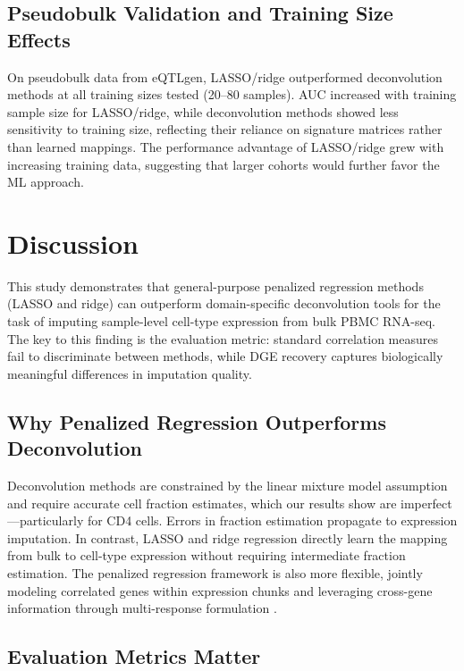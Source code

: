 \documentclass[12pt]{article}
\begin{document}
\subsection{Pseudobulk Validation and Training Size Effects}

On pseudobulk data from eQTLgen, LASSO/ridge outperformed deconvolution methods at all training sizes tested (20--80 samples). AUC increased with training sample size for LASSO/ridge, while deconvolution methods showed less sensitivity to training size, reflecting their reliance on signature matrices rather than learned mappings. The performance advantage of LASSO/ridge grew with increasing training data, suggesting that larger cohorts would further favor the ML approach.

\section{Discussion}

This study demonstrates that general-purpose penalized regression methods (LASSO and ridge) can outperform domain-specific deconvolution tools for the task of imputing sample-level cell-type expression from bulk PBMC RNA-seq. The key to this finding is the evaluation metric: standard correlation measures fail to discriminate between methods, while DGE recovery captures biologically meaningful differences in imputation quality.

\subsection{Why Penalized Regression Outperforms Deconvolution}

Deconvolution methods are constrained by the linear mixture model assumption and require accurate cell fraction estimates, which our results show are imperfect---particularly for CD4 cells. Errors in fraction estimation propagate to expression imputation. In contrast, LASSO and ridge regression directly learn the mapping from bulk to cell-type expression without requiring intermediate fraction estimation. The penalized regression framework is also more flexible, jointly modeling correlated genes within expression chunks and leveraging cross-gene information through multi-response formulation \citep{tibshirani1996lasso, hoerl1970ridge}.

\subsection{Evaluation Metrics Matter}
\end{document}
